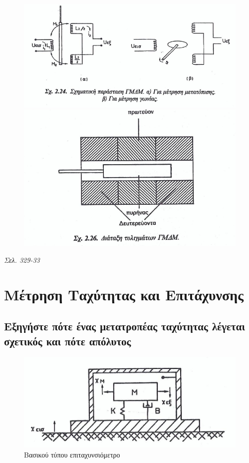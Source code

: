 \documentclass{article}
\begin{document}
\begin{figure}[h!]
    \includegraphics[width=\linewidth]{GMDM1.png}
    \includegraphics[width=\linewidth]{GMDM2.png}
\end{figure}
\emph{Σελ. 329-33}


\section{Μέτρηση Ταχύτητας και Επιτάχυνσης}
\subsection{Εξηγήστε πότε ένας μετατροπέας ταχύτητας λέγεται σχετικός και πότε απόλυτος}

\begin{figure}[h!]
    \includegraphics[width=\linewidth]{epitaxinsiometro.png}
    \caption{Βασικού τύπου επιταχυνσιόμετρο}
    \label{fig:5.1epitax}
\end{figure}
\end{document}
